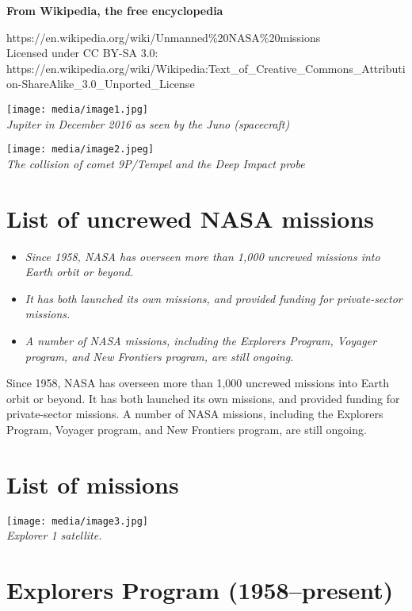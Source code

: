 \textbf{From Wikipedia, the free encyclopedia}

https://en.wikipedia.org/wiki/Unmanned\%20NASA\%20missions\\
Licensed under CC BY-SA 3.0:\\
https://en.wikipedia.org/wiki/Wikipedia:Text\_of\_Creative\_Commons\_Attribution-ShareAlike\_3.0\_Unported\_License

\texttt{[image: media/image1.jpg]}\\
\emph{Jupiter in December 2016 as seen by the Juno (spacecraft)}

\texttt{[image: media/image2.jpeg]}\\
\emph{The collision of comet 9P/Tempel and the Deep Impact probe}

\section{List of uncrewed NASA
missions}\label{list-of-uncrewed-nasa-missions}

\begin{itemize}
\item
  \emph{Since 1958, NASA has overseen more than 1,000 uncrewed missions
  into Earth orbit or beyond.}
\item
  \emph{It has both launched its own missions, and provided funding for
  private-sector missions.}
\item
  \emph{A number of NASA missions, including the Explorers Program,
  Voyager program, and New Frontiers program, are still ongoing.}
\end{itemize}

Since 1958, NASA has overseen more than 1,000 uncrewed missions into
Earth orbit or beyond. It has both launched its own missions, and
provided funding for private-sector missions. A number of NASA missions,
including the Explorers Program, Voyager program, and New Frontiers
program, are still ongoing.

\section{List of missions}\label{list-of-missions}

\texttt{[image: media/image3.jpg]}\\
\emph{Explorer 1 satellite.}

\section{Explorers Program
(1958--present)}\label{explorers-program-1958present}

